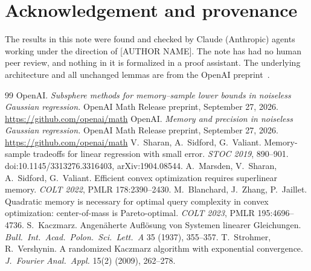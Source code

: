 \documentclass[11pt]{article}
\theoremstyle{definition}
\theoremstyle{remark}
\begin{document}
\section*{Acknowledgement and provenance}
The results in this note were found and checked by Claude (Anthropic) agents working under the direction of
[AUTHOR NAME]. The note has had no human peer review, and nothing in it is formalized in a proof assistant. The underlying architecture and all unchanged lemmas are from the OpenAI
preprint~\cite{OAIsub}.

\begin{thebibliography}{99}
 OpenAI. \emph{Subsphere methods for memory--sample lower bounds in noiseless Gaussian regression.}
OpenAI Math Release preprint, September 27, 2026. \url{https://github.com/openai/math}
 OpenAI. \emph{Memory and precision in noiseless Gaussian regression.}
OpenAI Math Release preprint, September 27, 2026. \url{https://github.com/openai/math}
 V.~Sharan, A.~Sidford, G.~Valiant. Memory-sample tradeoffs for linear regression with small error.
\emph{STOC 2019}, 890--901. doi:10.1145/3313276.3316403, arXiv:1904.08544.
 A.~Marsden, V.~Sharan, A.~Sidford, G.~Valiant. Efficient convex optimization requires superlinear memory.
\emph{COLT 2022}, PMLR 178:2390--2430.
 M.~Blanchard, J.~Zhang, P.~Jaillet. Quadratic memory is necessary for optimal query complexity in convex
optimization: center-of-mass is Pareto-optimal. \emph{COLT 2023}, PMLR 195:4696--4736.
 S.~Kaczmarz. Angen\"aherte Aufl\"osung von Systemen linearer Gleichungen.
\emph{Bull.\ Int.\ Acad.\ Polon.\ Sci.\ Lett.\ A} 35 (1937), 355--357.
 T.~Strohmer, R.~Vershynin. A randomized Kaczmarz algorithm with exponential convergence.
\emph{J.\ Fourier Anal.\ Appl.} 15(2) (2009), 262--278.
\end{thebibliography}
\end{document}
